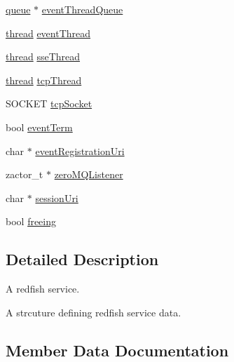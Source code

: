 \begin{DoxyCompactItemize}
\item 
\hyperlink{queue_8h_ae334156b4cde2f884517a660d81450cd}{queue} $\ast$ \hyperlink{struct__redfishService_a0ac7a354af33e114971bf0cf60fc1b26}{event\+Thread\+Queue}
\item 
\hyperlink{queue_8h_a1ab4f928aeccce6e6996ee96a4059c8a}{thread} \hyperlink{struct__redfishService_a8a8b4fd7844bb2a716d07442fc817810}{event\+Thread}
\item 
\hyperlink{queue_8h_a1ab4f928aeccce6e6996ee96a4059c8a}{thread} \hyperlink{struct__redfishService_a5cfc99e21117bbb500b618c4c29fdff0}{sse\+Thread}
\item 
\hyperlink{queue_8h_a1ab4f928aeccce6e6996ee96a4059c8a}{thread} \hyperlink{struct__redfishService_a996d74c5be8aec0056150bf04a67ad19}{tcp\+Thread}
\item 
S\+O\+C\+K\+ET \hyperlink{struct__redfishService_a352a6086f7d45aa2263fdf867dd97a2a}{tcp\+Socket}
\item 
bool \hyperlink{struct__redfishService_aa243f8de47227d24d0cd8482f270048a}{event\+Term}
\item 
char $\ast$ \hyperlink{struct__redfishService_a875599351c18230fe9342253ed5a4941}{event\+Registration\+Uri}
\item 
zactor\+\_\+t $\ast$ \hyperlink{struct__redfishService_a63dfd6f2784aad814ba5c34c1a2dac01}{zero\+M\+Q\+Listener}
\item 
char $\ast$ \hyperlink{struct__redfishService_ae4d4e7c7b6ad947f2ea0cf06c9980557}{session\+Uri}
\item 
bool \hyperlink{struct__redfishService_a896102e06db049b99f32541bb9a4cb1e}{freeing}
\end{DoxyCompactItemize}


\subsection{Detailed Description}
A redfish service. 

A strcuture defining redfish service data. 

\subsection{Member Data Documentation}
\mbox{\label{struct__redfishService_a9667f250bdf1205a6947d7ee63ee25ec}} 
